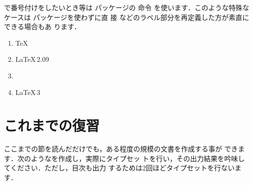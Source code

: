 {\begin{Trick}
で番号付けをしたいとき等は  パッケージの  命令
を使います．このような特殊なケースは  パッケージを使わずに直
接  などのラベル部分を再定義した方が素直にできる場合もあ
ります．

\begin{InTeX}
\begin{enumerate}
\renewcommand\labelenumi{\MARU{\arabic{enumi}}}
\item \TeX
\item \LaTeX\,2.09
\item \LaTeXe
\item \LaTeX\,3
\end{enumerate} 
\end{InTeX}
\end{Trick}

\section{これまでの復習}

\begin{Prob}
ここまでの節を読んだだけでも，ある程度の規模の文書を作成する事が
できます．次のようなを作成し，実際にタイプセッ
トを行い，その出力結果を吟味してください．ただし，目次も出力
するためは2回ほどタイプセットを行ないます．

\end{Prob}}
